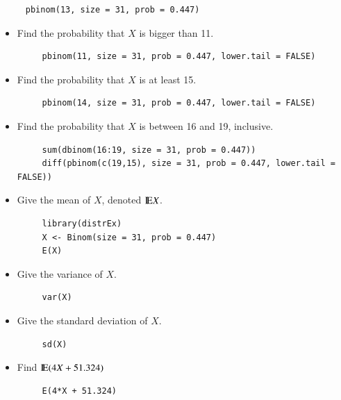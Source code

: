 \documentclass[captions=tableheading]{scrbook}
\begin{document}
\begin{xca}
\begin{itemize}
\begin{verbatim}
     pbinom(13, size = 31, prob = 0.447)
\end{verbatim}
\end{itemize}
\begin{itemize}
\item Find the probability that \(X\) is bigger than 11.

\begin{verbatim}
     pbinom(11, size = 31, prob = 0.447, lower.tail = FALSE)
\end{verbatim}
\end{itemize}
\begin{itemize}
\item Find the probability that \(X\) is at least 15.

\begin{verbatim}
     pbinom(14, size = 31, prob = 0.447, lower.tail = FALSE)
\end{verbatim}
\end{itemize}
\begin{itemize}
\item Find the probability that \(X\) is between 16 and 19, inclusive.

\begin{verbatim}
     sum(dbinom(16:19, size = 31, prob = 0.447))
     diff(pbinom(c(19,15), size = 31, prob = 0.447, lower.tail = FALSE))
\end{verbatim}
\end{itemize}
\begin{itemize}
\item Give the mean of \(X\), denoted \(\mathrm{I\hspace{-1.5pt}E} X\).

\begin{verbatim}
     library(distrEx)
     X <- Binom(size = 31, prob = 0.447)
     E(X)
\end{verbatim}
\end{itemize}
\begin{itemize}
\item Give the variance of \(X\).

\begin{verbatim}
     var(X)
\end{verbatim}
\end{itemize}
\begin{itemize}
\item Give the standard deviation of \(X\).

\begin{verbatim}
     sd(X)
\end{verbatim}
\end{itemize}
\begin{itemize}
\item Find \(\mathrm{I\hspace{-1.5pt}E}(4X+51.324)\)

\begin{verbatim}
     E(4*X + 51.324)
\end{verbatim}
\end{itemize}
\end{xca}
\end{document}
